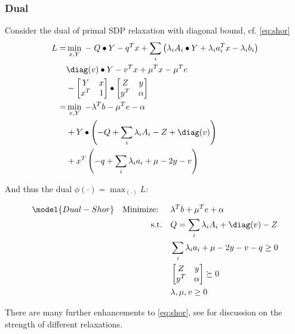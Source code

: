 \documentclass[../main]{subfiles}
\begin{document}
\subsubsection{Dual}
Consider the dual of primal SDP relaxation with diagonal bound, cf. \eqref{eq:shor}
\begin{equation}
  \begin{aligned}
    L = & \min_{x, Y} \; -\; Q\bullet Y - q^Tx + \sum_i \left( \lambda_i A_i \bullet Y  + \lambda_i a_i^Tx - \lambda_i b_i \right ) \\
        & \diag(v) \bullet Y - v^T x + \mu^Tx - \mu^Te                                                                              \\
        & - \begin{bmatrix}Y & x \\ x^T & 1\end{bmatrix} \bullet
    \begin{bmatrix}Z & y \\ y^T & \alpha\end{bmatrix}                                                                                                      \\
    =   & \min_{x, Y} \; - \lambda^T b - \mu^Te - \alpha                                                                            \\
        & + Y \bullet \left(-Q + \sum_i\lambda_iA_i - Z + \diag(v)\right)                                                           \\
        & + x^T\left(- q + \sum_i \lambda_i a_i + \mu - 2 y - v\right)
  \end{aligned}
\end{equation}

And thus the dual \(\phi(\cdot) = \max_{(\cdot)} L\):

\begin{equation}
  \begin{aligned}
    \model{Dual-Shor} \quad \textrm{Minimize: }\quad & \lambda^Tb + \mu^Te + \alpha                   \\
    \mathrm{s.t.} \quad                              & Q = \sum_i \lambda_i A_i  + \diag(v)  -Z       \\
                                                     & \sum_i \lambda_i a_i + \mu - 2 y - v - q \ge 0 \\
                                                     & \begin{bmatrix}Z & y \\ y^T & \alpha\end{bmatrix} \succeq 0           \\
                                                     & \lambda, \mu, v \ge 0
  \end{aligned}
\end{equation}

There are many further enhancements to \eqref{eq:shor}, see \cite{bao_semidefinite_2011} for discussion on the strength of different relaxations.
\end{document}
